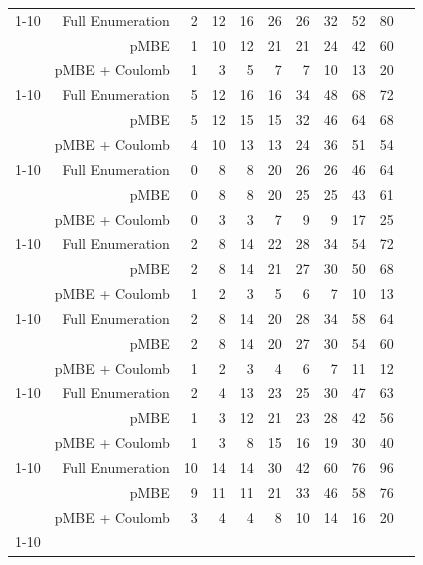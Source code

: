 \begin{longtable}{lrrrrrrrrrr}
\cline{1-10}
\multirow[c]{3}{*}{Pyrazine} & Full Enumeration & 2 & 12 & 16 & 26 & 26 & 32 & 52 & 80 \\
 & pMBE & 1 & 10 & 12 & 21 & 21 & 24 & 42 & 60 \\
 & pMBE + Coulomb & 1 & 3 & 5 & 7 & 7 & 10 & 13 & 20 \\
\cline{1-10}
\multirow[c]{3}{*}{Pyrazole} & Full Enumeration & 5 & 12 & 16 & 16 & 34 & 48 & 68 & 72 \\
 & pMBE & 5 & 12 & 15 & 15 & 32 & 46 & 64 & 68 \\
 & pMBE + Coulomb & 4 & 10 & 13 & 13 & 24 & 36 & 51 & 54 \\
\cline{1-10}
\multirow[c]{3}{*}{Succinic Acid} & Full Enumeration & 0 & 8 & 8 & 20 & 26 & 26 & 46 & 64 \\
 & pMBE & 0 & 8 & 8 & 20 & 25 & 25 & 43 & 61 \\
 & pMBE + Coulomb & 0 & 3 & 3 & 7 & 9 & 9 & 17 & 25 \\
\cline{1-10}
\multirow[c]{3}{*}{Triazine} & Full Enumeration & 2 & 8 & 14 & 22 & 28 & 34 & 54 & 72 \\
 & pMBE & 2 & 8 & 14 & 21 & 27 & 30 & 50 & 68 \\
 & pMBE + Coulomb & 1 & 2 & 3 & 5 & 6 & 7 & 10 & 13 \\
\cline{1-10}
\multirow[c]{3}{*}{Trioxane} & Full Enumeration & 2 & 8 & 14 & 20 & 28 & 34 & 58 & 64 \\
 & pMBE & 2 & 8 & 14 & 20 & 27 & 30 & 54 & 60 \\
 & pMBE + Coulomb & 1 & 2 & 3 & 4 & 6 & 7 & 11 & 12 \\
\cline{1-10}
\multirow[c]{3}{*}{Uracil} & Full Enumeration & 2 & 4 & 13 & 23 & 25 & 30 & 47 & 63 \\
 & pMBE & 1 & 3 & 12 & 21 & 23 & 28 & 42 & 56 \\
 & pMBE + Coulomb & 1 & 3 & 8 & 15 & 16 & 19 & 30 & 40 \\
\cline{1-10}
\multirow[c]{3}{*}{Urea} & Full Enumeration & 10 & 14 & 14 & 30 & 42 & 60 & 76 & 96 \\
 & pMBE & 9 & 11 & 11 & 21 & 33 & 46 & 58 & 76 \\
 & pMBE + Coulomb & 3 & 4 & 4 & 8 & 10 & 14 & 16 & 20 \\
\cline{1-10}
\end{longtable}